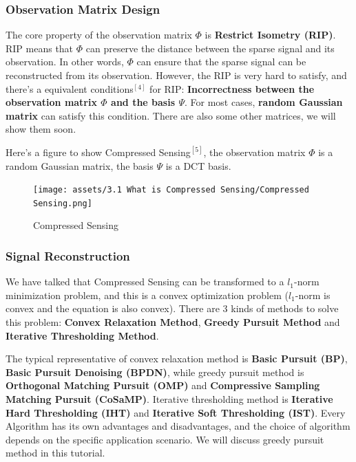 \documentclass[12pt]{ctexart}
\begin{document}
\subsubsection{\textbf{Observation Matrix Design}}

The core property of the observation matrix $\Phi$ is \textbf{Restrict Isometry (RIP)}.
RIP means that $\Phi$ can preserve the distance between the sparse signal and its
observation. In other words, $\Phi$ can ensure that the sparse signal can be reconstructed
from its observation. However, the RIP is very hard to satisfy, and there's a equivalent
conditions$^{[4]}$ for RIP: \textbf{Incorrectness between the observation matrix $\Phi$ and
the basis $\Psi$}. For most cases, \textbf{random Gaussian matrix} can satisfy this
condition. There are also some other matrices, we will show them soon.

Here's a figure to show Compressed Sensing$^{[5]}$, the observation matrix $\Phi$ is a
random Gaussian matrix, the basis $\Psi$ is a DCT basis.

\begin{figure}[H]
  \centering
  \texttt{[image: assets/3.1 What is Compressed Sensing/Compressed
  Sensing.png]}
  \caption{Compressed Sensing}
\end{figure}

\subsubsection{\textbf{Signal Reconstruction}}

We have talked that Compressed Sensing can be transformed to a $l_1$-norm minimization
problem, and this is a convex optimization problem ($l_1$-norm is convex and the equation
is also convex). There are 3 kinds of methods to solve this problem: \textbf{Convex Relaxation
Method}, \textbf{Greedy Pursuit Method} and \textbf{Iterative Thresholding Method}.

The typical representative of convex relaxation method is \textbf{Basic Pursuit (BP)},
\textbf{Basic Pursuit Denoising (BPDN)}, while greedy pursuit method is \textbf{Orthogonal
Matching Pursuit (OMP)} and \textbf{Compressive Sampling Matching Pursuit (CoSaMP)}. 
Iterative thresholding method is \textbf{Iterative Hard Thresholding (IHT)} and
\textbf{Iterative Soft Thresholding (IST)}. Every Algorithm has its own advantages and
disadvantages, and the choice of algorithm depends on the specific application scenario.
We will discuss greedy pursuit method in this tutorial.
\end{document}
